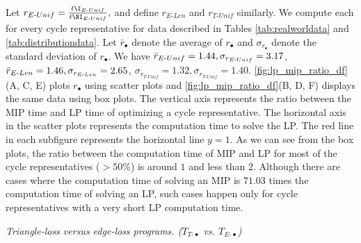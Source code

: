 Let $r_{E\text{-}Unif} = \frac{t\I_{E\text{-}Unif}}{t\NI_{E\text{-}Unif}},$ and define $r_{E\text{-}Len}$ and $r_{T\text{-}Unif}$ similarly. We compute each for every cycle representative for data described in Tables \ref{tab:realworldata} and \ref{tab:distributiondata}. Let $\bar{r}_\bullet$ denote the average of $r_\bullet$ and $\sigma_{r_\bullet}$ denote the standard deviation of $r_\bullet$. We have $\Bar{r}_{E\text{-}Unif} = 1.44 , \sigma_{r_{E\text{-}Unif}} = 3.17$, $\Bar{r}_{E\text{-}Len} = 1.46,  \sigma_{r_{E\text{-}Len}} = 2.65$, $ \sigma_{r_{T\text{-}Unif}} = 1.32, \sigma_{r_{T\text{-}Unif}} = 1.40$. \fig \ref{fig:lp_mip_ratio_df}(A, C, E) plots $r_\bullet$ using scatter plots and \fig \ref{fig:lp_mip_ratio_df}(B, D, F) displays the same data using box plots. The vertical axis represents the ratio between the MIP time and LP time of optimizing a cycle representative. The horizontal axis in the scatter plots represents the computation time to solve the LP. The red line in each subfigure represents the horizontal line $y=1$. As we can see from the box plots, the ratio between the computation time of MIP and LP for most of the cycle representatives ($>50\%$) is around $1$ and less than $2$. Although there are cases where the computation time of solving an MIP is $71.03$ times the computation time of solving an LP, such cases happen only for cycle representatives with a very short LP computation time. %


\emph{Triangle-loss versus edge-loss programs. ($T_{T\text{-}\bullet}$ vs. $T_{E\text{-}\bullet}$)} 



